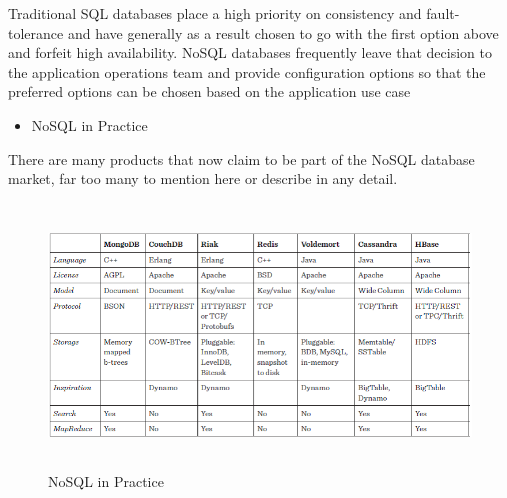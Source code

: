 Traditional SQL databases place a high priority on consistency and fault-tolerance and have generally as a result chosen to go with the first option above and forfeit high availability. NoSQL databases frequently leave that decision to the application operations team and provide configuration options so that the preferred options can be chosen based on the application use case

\begin{itemize}
    \item NoSQL in Practice
\end{itemize}
There are many products that now claim to be part of the NoSQL database market, far too many to mention here or describe in any detail.
\\
\begin{figure}[h]
\centering
  \includegraphics[width=13cm,height=7cm]{T1.png}
  \caption{NoSQL in Practice}\label{NoSQL in Practice}
\end{figure}

